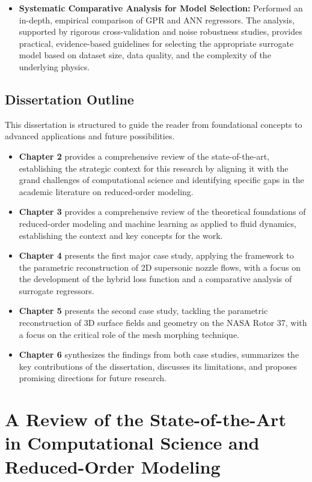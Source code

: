 \documentclass[dsc, EN]{ufabcFHZh}
\begin{document}
{\begin{itemize}
    \item \textbf{Systematic Comparative Analysis for Model Selection:} Performed an in-depth, empirical comparison of GPR and ANN regressors. The analysis, supported by rigorous cross-validation and noise robustness studies, provides practical, evidence-based guidelines for selecting the appropriate surrogate model based on dataset size, data quality, and the complexity of the underlying physics.
\end{itemize}


\section{Dissertation Outline}

This dissertation is structured to guide the reader from foundational concepts to advanced applications and future possibilities.


\begin{itemize}
    \item \textbf{Chapter 2} provides a comprehensive review of the state-of-the-art, establishing the strategic context for this research by aligning it with the grand challenges of computational science and identifying specific gaps in the academic literature on reduced-order modeling.
    \item \textbf{Chapter 3} provides a comprehensive review of the theoretical foundations of reduced-order modeling and machine learning as applied to fluid dynamics, establishing the context and key concepts for the work.
    \item \textbf{Chapter 4} presents the first major case study, applying the framework to the parametric reconstruction of 2D supersonic nozzle flows, with a focus on the development of the hybrid loss function and a comparative analysis of surrogate regressors.
    \item \textbf{Chapter 5} presents the second case study, tackling the parametric reconstruction of 3D surface fields and geometry on the NASA Rotor 37, with a focus on the critical role of the mesh morphing technique.
    \item \textbf{Chapter 6} synthesizes the findings from both case studies, summarizes the key contributions of the dissertation, discusses its limitations, and proposes promising directions for future research.
\end{itemize}
  
\chapter{A Review of the State-of-the-Art in Computational Science and Reduced-Order Modeling}

}
\end{document}
